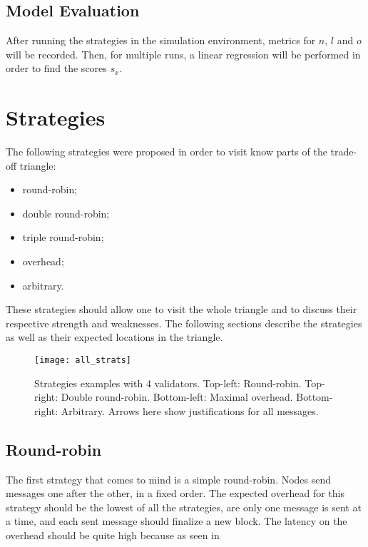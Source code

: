 \subsection{Model Evaluation}
After running the strategies in the simulation environment, metrics for \(n\),
\(l\) and \(o\) will be recorded. Then, for multiple runs, a linear regression
will be performed in order to find the scores \(s_x\).

\section{Strategies}
\label{sec:strategies}

The following strategies were proposed in order to visit know parts of the
trade-off triangle:
\begin{itemize}
        \item round-robin;
        \item double round-robin;
        \item triple round-robin;
        \item overhead;
        \item arbitrary.
\end{itemize}
These strategies should allow one to visit the whole triangle and to discuss
their respective strength and weaknesses. The following sections describe the
strategies as well as their expected locations in the triangle.

\begin{figure}[h]
	\centering
	\texttt{[image: all\_strats]}
  \captionsetup{justification=centering}
    \caption{Strategies examples with 4 validators. Top-left: Round-robin.
    Top-right: Double round-robin. Bottom-left: Maximal overhead. Bottom-right:
    Arbitrary. Arrows here show justifications for all messages.}
	\label{fig:allStrats}
\end{figure}

\subsection{Round-robin}
The first strategy that comes to mind is a simple round-robin. Nodes send
messages one after the other, in a fixed order. The expected overhead for this
strategy should be the lowest of all the strategies, are only one message is
sent at a time, and each sent message should finalize a new block. The latency
on the overhead should be quite high because as seen in 


